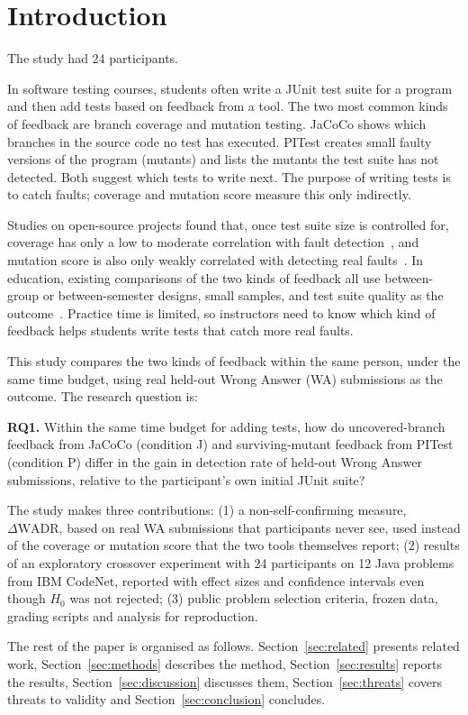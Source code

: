 \section{Introduction}
\label{sec:intro}

The study had 24 participants.

In software testing courses, students often write a JUnit test suite for a program and then add tests based on feedback from a tool. The two most common kinds of feedback are branch coverage and mutation testing. JaCoCo shows which branches in the source code no test has executed. PITest creates small faulty versions of the program (mutants) and lists the mutants the test suite has not detected. Both suggest which tests to write next. The purpose of writing tests is to catch faults; coverage and mutation score measure this only indirectly.

Studies on open-source projects found that, once test suite size is controlled for, coverage has only a low to moderate correlation with fault detection~\cite{inozemtseva2014}, and mutation score is also only weakly correlated with detecting real faults~\cite{papadakis2018}. In education, existing comparisons of the two kinds of feedback all use between-group or between-semester designs, small samples, and test suite quality as the outcome~\cite{mansur2024,alonge2025}. Practice time is limited, so instructors need to know which kind of feedback helps students write tests that catch more real faults.

This study compares the two kinds of feedback within the same person, under the same time budget, using real held-out Wrong Answer (WA) submissions as the outcome. The research question is:

\textbf{RQ1.} Within the same time budget for adding tests, how do uncovered-branch feedback from JaCoCo (condition J) and surviving-mutant feedback from PITest (condition P) differ in the gain in detection rate of held-out Wrong Answer submissions, relative to the participant's own initial JUnit suite?

The study makes three contributions: (1) a non-self-confirming measure, $\Delta\mathrm{WADR}$, based on real WA submissions that participants never see, used instead of the coverage or mutation score that the two tools themselves report; (2) results of an exploratory crossover experiment with 24 participants on 12 Java problems from IBM CodeNet, reported with effect sizes and confidence intervals even though $H_0$ was not rejected; (3) public problem selection criteria, frozen data, grading scripts and analysis for reproduction.

The rest of the paper is organised as follows. Section~\ref{sec:related} presents related work, Section~\ref{sec:methods} describes the method, Section~\ref{sec:results} reports the results, Section~\ref{sec:discussion} discusses them, Section~\ref{sec:threats} covers threats to validity and Section~\ref{sec:conclusion} concludes.
